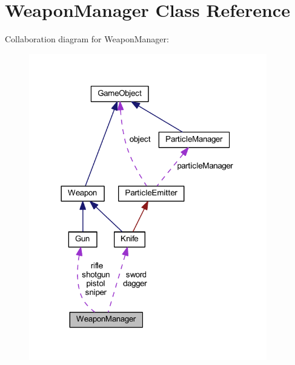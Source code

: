 \hypertarget{class_weapon_manager}{\section{Weapon\+Manager Class Reference}
\label{class_weapon_manager}
}


Collaboration diagram for Weapon\+Manager\+:\nopagebreak
\begin{figure}[H]
\begin{center}
\leavevmode
\includegraphics[width=294pt]{class_weapon_manager__coll__graph}
\end{center}
\end{figure}
